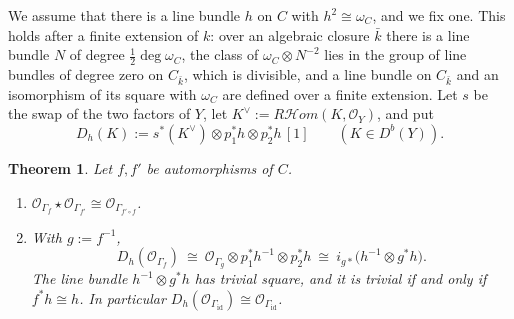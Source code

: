 \documentclass[11pt]{amsart}
\newtheorem{theorem}{Theorem}[section]
\theoremstyle{definition}
\theoremstyle{remark}
\newcommand{\id}{\operatorname{id}}
\begin{document}
We assume that there is a line bundle $h$ on $C$ with $h^{2}\cong\omega_C$,
and we fix one.  This holds after a finite extension of $k$: over an algebraic
closure $\bar k$ there is a line bundle $N$ of degree $\tfrac12\deg\omega_C$,
the class of $\omega_C\otimes N^{-2}$ lies in the group of line bundles of
degree zero on $C_{\bar k}$, which is divisible, and a line bundle on
$C_{\bar k}$ and an isomorphism of its square with $\omega_C$ are defined over
a finite extension.  Let $s$ be the swap of the two factors of $Y$, let
$K^{\vee}:=R\mathcal{H}om(K,\mathcal O_Y)$, and put
\[
D_h(K):=s^{*}(K^{\vee})\otimes p_1^{*}h\otimes p_2^{*}h\,[1]\qquad
(K\in D^{b}(Y)).
\]

\begin{theorem}\label{thm:classical}
Let $f,f'$ be automorphisms of $C$.
\begin{enumerate}
\item[(a)] $\mathcal O_{\Gamma_f}\star\mathcal O_{\Gamma_{f'}}\cong
\mathcal O_{\Gamma_{f'\circ f}}$.
\item[(b)] With $g:=f^{-1}$,
\begin{equation}\label{eq:dualitygraph}
D_h(\mathcal O_{\Gamma_f})\ \cong\
\mathcal O_{\Gamma_{g}}\otimes p_1^{*}h^{-1}\otimes p_2^{*}h
\ \cong\ i_{g*}\bigl(h^{-1}\otimes g^{*}h\bigr).
\end{equation}
The line bundle $h^{-1}\otimes g^{*}h$ has trivial square, and it is trivial
if and only if $f^{*}h\cong h$.  In particular
$D_h(\mathcal O_{\Gamma_{\id}})\cong\mathcal O_{\Gamma_{\id}}$.
\end{enumerate}
\end{theorem}
\end{document}
